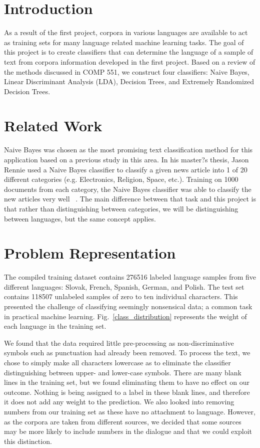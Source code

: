 \documentclass[conference]{IEEEtran}
\begin{document}
\section{Introduction}
As a result of the first project, corpora in various languages are available to act as training sets for many language related machine learning tasks. The goal of this project is to create classifiers that can determine the language of a sample of text from corpora information developed in the first project. Based on a review of the methods discussed in COMP 551, we construct four classifiers: Naive Bayes, Linear Discriminant Analysis (LDA), Decision Trees, and Extremely Randomized Decision Trees.


\section{Related Work}
Naive Bayes was chosen as the most promising text classification method for this application based on a previous study in this area. In his master?s thesis, Jason Rennie used a Naive Bayes classifier to classify a given news article into 1 of 20 different categories (e.g. Electronics, Religion, Space, etc.). Training on 1000 documents from each category, the Naive Bayes classifier was able to classify the new articles very well ~\cite{Rennie}. The main difference between that task and this project is that rather than distinguishing between categories, we will be distinguishing between languages, but the same concept applies. 

\section{Problem Representation}
The compiled training dataset contains 276516 labeled language samples from five different languages: Slovak, French, Spanish, German, and Polish. The test set contains 118507 unlabeled samples of zero to ten individual characters. This presented the challenge of classifying seemingly nonsensical data; a common task in practical machine learning. Fig.~\ref{class_distribution} represents the weight of each language in the training set. 

We found that the data required little pre-processing as non-discriminative symbols such as punctuation had already been removed. To process the text, we chose to simply make all characters lowercase as to eliminate the classifier distinguishing between upper- and lower-case symbols. There are many blank lines in the training set, but we found eliminating them to have no effect on our outcome. Nothing is being assigned to a label in these blank lines, and therefore it does not add any weight to the prediction. We also looked into removing numbers from our training set as these have no attachment to language. However, as the corpora are taken from different sources, we decided that some sources may be more likely to include numbers in the dialogue and that we could exploit this distinction.
\end{document}
